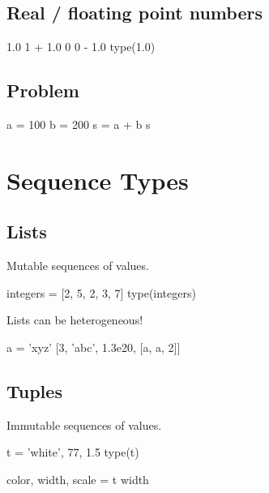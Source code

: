 \documentclass[aspectratio=1610,slidestop]{beamer}
\begin{document}
\subsection{Real / floating point numbers}
\begin{pframe}
\begin{pyconsole}
1.0
1 + 1.0
0
0 - 1.0
type(1.0)
\end{pyconsole}
\end{pframe}

\subsection{Problem}
\begin{pframe}
\begin{minipage}[t]{0.47\textwidth}

\end{minipage}
\begin{minipage}[t]{0.47\textwidth}
\vspace{-5cm}
\begin{pyconsole}
a = 100
b = 200
s = a + b
s
\end{pyconsole}
\end{minipage}
\end{pframe}

\section{Sequence Types}
\makeTableOfContentsSection

\subsection{Lists}
\begin{pframe}
Mutable sequences of values.
\begin{pyconsole}
integers = [2, 5, 2, 3, 7]
type(integers)
\end{pyconsole}
\medskip
\medskip
Lists can be heterogeneous!
\begin{pyconsole}
a = 'xyz'
[3, 'abc', 1.3e20, [a, a, 2]]
\end{pyconsole}
\end{pframe}


\subsection{Tuples}
\begin{pframe}
Immutable sequences of values.
\begin{pyconsole}
t = 'white', 77, 1.5
type(t)

color, width, scale = t
width
\end{pyconsole}
\end{pframe}
\end{document}
